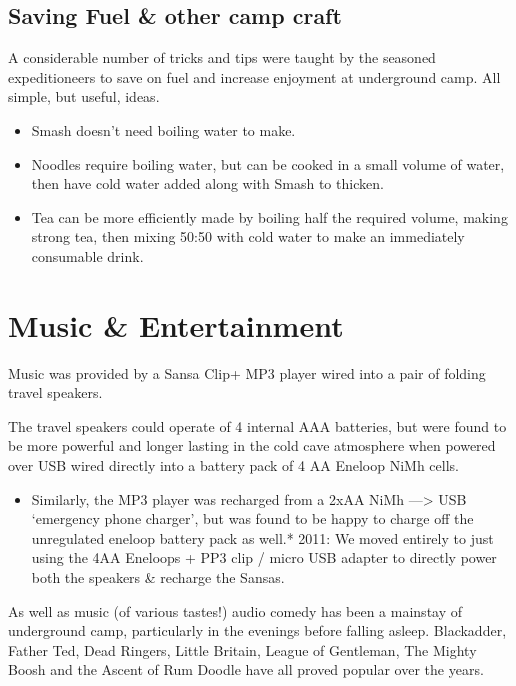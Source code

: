 \subsection{Saving Fuel \& other camp
craft}\label{saving-fuel-other-camp-craft}

A considerable number of tricks and tips were taught by the seasoned
expeditioneers to save on fuel and increase enjoyment at underground
camp. All simple, but useful, ideas.

\begin{itemize}
\tightlist
\item
  Smash doesn't need boiling water to make.
\item
  Noodles require boiling water, but can be cooked in a small volume of
  water, then have cold water added along with Smash to thicken.
\item
  Tea can be more efficiently made by boiling half the required volume,
  making strong tea, then mixing 50:50 with cold water to make an
  immediately consumable drink.
\end{itemize}

\section{Music \& Entertainment}\label{music-entertainment}

Music was provided by a Sansa Clip+ MP3 player wired into a pair of
folding travel speakers.

The travel speakers could operate of 4 internal AAA batteries, but were
found to be more powerful and longer lasting in the cold cave atmosphere
when powered over USB wired directly into a battery pack of 4 AA Eneloop
NiMh cells.

\begin{itemize}
\tightlist
\item
  Similarly, the MP3 player was recharged from a 2xAA NiMh
  ---\textgreater{} USB `emergency phone charger', but was found to be
  happy to charge off the unregulated eneloop battery pack as well.*
  2011: We moved entirely to just using the 4AA Eneloops + PP3 clip /
  micro USB adapter to directly power both the speakers \& recharge the
  Sansas.
\end{itemize}

As well as music (of various tastes!) audio comedy has been a mainstay
of underground camp, particularly in the evenings before falling asleep.
Blackadder, Father Ted, Dead Ringers, Little Britain, League of
Gentleman, The Mighty Boosh and the Ascent of Rum Doodle have all proved
popular over the years.

